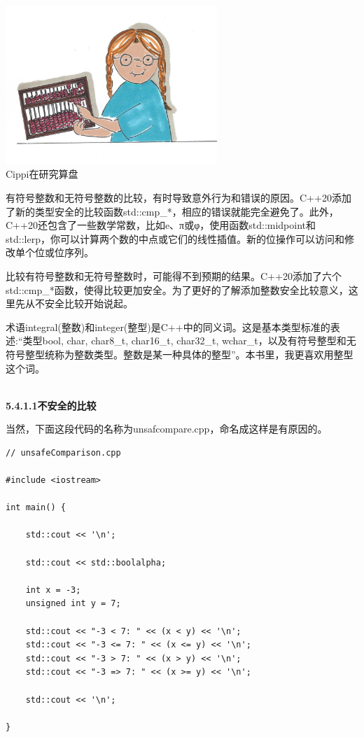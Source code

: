 \begin{center}
\includegraphics[width=0.6\textwidth]{content/3/chapter5/images/15.png}\\
Cippi在研究算盘
\end{center}

有符号整数和无符号整数的比较，有时导致意外行为和错误的原因。C++20添加了新的类型安全的比较函数std::cmp\_*，相应的错误就能完全避免了。此外，C++20还包含了一些数学常数，比如e、π或φ，使用函数std::midpoint和std::lerp，你可以计算两个数的中点或它们的线性插值。新的位操作可以访问和修改单个位或位序列。


比较有符号整数和无符号整数时，可能得不到预期的结果。C++20添加了六个std::cmp\_*函数，使得比较更加安全。为了更好的了解添加整数安全比较意义，这里先从不安全比较开始说起。

\begin{tcolorbox}[breakable,enhanced jigsaw,colback=blue!5!white,colframe=blue!75!black,title={整数与整型}]
	
术语integral(整数)和integer(整型)是C++中的同义词。这是基本类型标准的表述:“类型bool, char, char8\_t, char16\_t, char32\_t, wchar\_t，以及有符号整型和无符号整型统称为整数类型。整数是某一种具体的整型”。本书里，我更喜欢用整型这个词。
	
\end{tcolorbox}

\hspace*{\fill} \\ %
\noindent
\textbf{5.4.1.1\hspace{0.2cm}不安全的比较}

当然，下面这段代码的名称为unsafcompare.cpp，命名成这样是有原因的。

\begin{lstlisting}[style=styleCXX]
// unsafeComparison.cpp

#include <iostream>

int main() {
	
	std::cout << '\n';
	
	std::cout << std::boolalpha;
	
	int x = -3;
	unsigned int y = 7;
	
	std::cout << "-3 < 7: " << (x < y) << '\n';
	std::cout << "-3 <= 7: " << (x <= y) << '\n';
	std::cout << "-3 > 7: " << (x > y) << '\n';
	std::cout << "-3 => 7: " << (x >= y) << '\n';
	
	std::cout << '\n';

}
\end{lstlisting}

